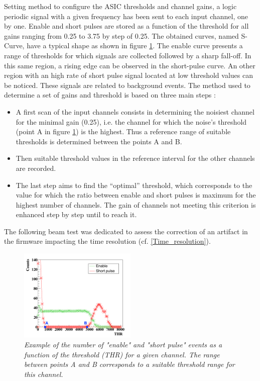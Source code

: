 \documentclass[a4paper,11pt]{article}
\begin{document}
Setting method to configure the ASIC thresholds and channel gains, a logic periodic signal with a given frequency has been sent to each input channel, one by one. Enable and short pulses are stored as a function of the threshold for all gains ranging from 0.25 to 3.75 by step of 0.25. The obtained curves, named S-Curve, have a typical shape as shown in figure \ref{fig:S_Curve}. The enable curve presents a range of thresholds for which signals are collected followed by a sharp fall-off. In this same region, a rising edge can be observed in the short-pulse curve. An other region with an high rate of short pulse signal located at low threshold values can be noticed. These signals are related to background events. The method used to determine a set of gains and threshold is based on three main steps :
\begin{itemize}
\item A first scan of the input channels consists in determining the noisiest channel for the minimal gain (0.25), i.e. the channel for which the noise’s threshold (point A in figure \ref{fig:S_Curve}) is the highest. Thus a reference range of suitable thresholds is determined between the points A and B.
\item Then suitable threshold values in the reference interval for the other channels are recorded.
\item The last step aims to find the “optimal” threshold, which corresponds to the value for which the ratio between enable and short pulses is maximum for the highest number of channels. The gain of channels not meeting this criterion is enhanced step by step until to reach it.
\end{itemize}
The following beam test was dedicated to assess the correction of an artifact in the firmware impacting the time resolution (cf. \ref{Time_resolution}).

\begin{figure}[H]
\centering
\includegraphics[width=0.5\textwidth]{figures/S_Curve_Thr_suitable_rangeAB.pdf}
\caption{\small{\textit{Example of the number of "enable" and "short pulse" events as a function of the threshold (THR) for a given channel. The range between points A and B corresponds to a suitable threshold range for this channel.}}}
\label{fig:S_Curve}
\end{figure}
\end{document}
